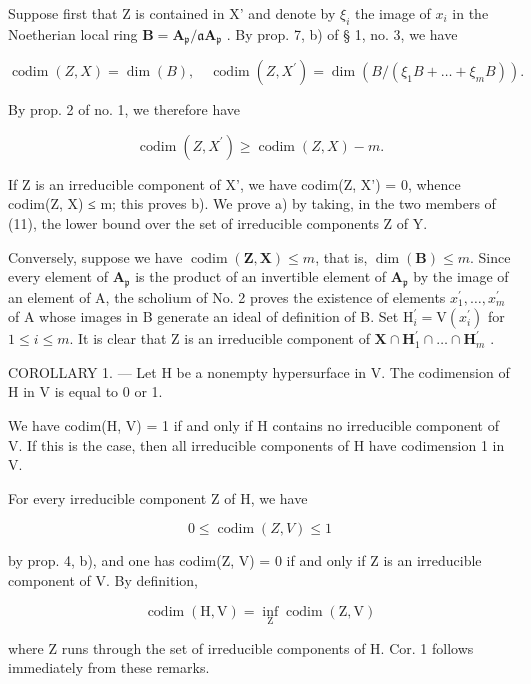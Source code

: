 Suppose first that Z is contained in X' and denote by \(\xi_{i}\) the image of \(x_{i}\) in the Noetherian local ring \(\mathbf{B} = \mathbf{A}_{\mathfrak{p}} / \mathfrak{a}\mathbf{A}_{\mathfrak{p}}\) . By prop. 7, b) of § 1, no. 3, we have

\[
\operatorname{codim} (Z, X) = \dim (B), \quad \operatorname{codim} (Z, X ^ {\prime}) = \dim (B / (\xi_ {1} B + \dots + \xi_ {m} B)).
\]

By prop. 2 of no. 1, we therefore have

\[
\operatorname{codim} (Z, X ^ {\prime}) \geqslant \operatorname{codim} (Z, X) - m.\tag{11}
\]

If Z is an irreducible component of X', we have codim(Z, X') = 0, whence codim(Z, X) ≤ m; this proves b). We prove a) by taking, in the two members of (11), the lower bound over the set of irreducible components Z of Y.

Conversely, suppose we have \(\operatorname{codim}(\mathbf{Z},\mathbf{X})\leqslant m\), that is, \(\dim (\mathbf{B})\leqslant m\). Since every element of \(\mathbf{A}_{\mathfrak{p}}\) is the product of an invertible element of \(\mathbf{A}_{\mathfrak{p}}\) by the image of an element of A, the scholium of No. 2 proves the existence of elements \(x_1^{\prime},\ldots ,x_m^\prime\) of A whose images in B generate an ideal of definition of B. Set \(\mathrm{H}_i^{\prime} = \mathrm{V}(x_i^{\prime})\) for \(1\leqslant i\leqslant m\). It is clear that Z is an irreducible component of \(\mathbf{X}\cap \mathbf{H}_1^{\prime}\cap \dots \cap \mathbf{H}_m^{\prime}\) .

COROLLARY 1. --- Let H be a nonempty hypersurface in V. The codimension of H in V is equal to 0 or 1.

We have codim(H, V) = 1 if and only if H contains no irreducible component of V. If this is the case, then all irreducible components of H have codimension 1 in V.

For every irreducible component Z of H, we have

\[
0 \leqslant \operatorname{codim} (Z, V) \leqslant 1
\]

by prop. 4, b), and one has codim(Z, V) = 0 if and only if Z is an irreducible component of V. By definition,

\[
\operatorname{codim} (\mathrm{H}, \mathrm{V}) = \inf _ {\mathrm{Z}} \operatorname{codim} (\mathrm{Z}, \mathrm{V})
\]

where Z runs through the set of irreducible components of H. Cor. 1 follows immediately from these remarks.

